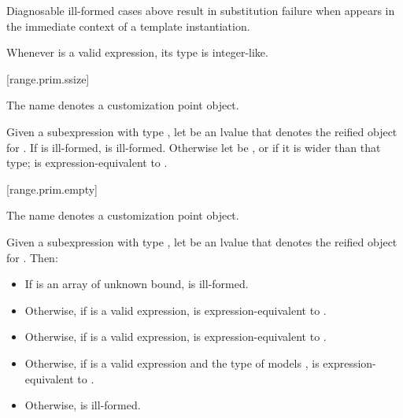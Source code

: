 \pnum
\begin{note}
Diagnosable ill-formed cases above
result in substitution failure when 
appears in the immediate context of a template instantiation.
\end{note}

\pnum
\begin{note}
Whenever  is a valid expression, its
type is integer-like.
\end{note}

[range.prim.ssize]{}
%

\pnum
The name  denotes
a customization point object.

\pnum
Given a subexpression  with type ,
let  be an lvalue that denotes the reified object for .
If  is ill-formed,
 is ill-formed.
Otherwise let  be
, or
 if it is wider than that type;
 is expression-equivalent to
.

[range.prim.empty]{}
%

\pnum
The name  denotes a customization point
object.

\pnum
Given a subexpression  with type ,
let  be an lvalue that denotes the reified object for .
Then:

\begin{itemize}
\item
  If  is an array of unknown bound,
   is ill-formed.

\item
  Otherwise, if  is a valid expression,
   is expression-equivalent to
  .

\item
  Otherwise, if  is a valid expression,
   is expression-equiva\-lent to
  .

\item
  Otherwise, if 
  is a valid expression and
  the type of  models ,
   is expression-equivalent to
  .

\item
  Otherwise,  is ill-formed.
\end{itemize}

